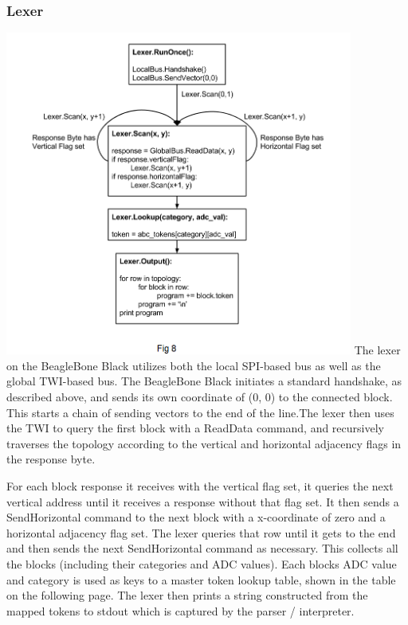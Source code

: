 \documentclass[12pt,a4paper]{article}
\begin{document}
    \subsubsection{Lexer}
    \includegraphics[width=4.5in]{LX.png}
    The lexer on the BeagleBone Black utilizes both the local SPI-based bus as well as the global TWI-based bus. The BeagleBone Black initiates a standard handshake, as described above, and sends its own coordinate of (0, 0) to the connected block. This starts a chain of sending vectors to the \textquotesingle end of the line.\textquotesingle   The lexer then uses the TWI to query the first block with a ReadData command, and recursively traverses the topology according to the vertical and horizontal adjacency flags in the response byte. 
    
    
    For each block response it receives with the vertical flag set, it queries the next vertical address until it receives a response without that flag set. It then sends a SendHorizontal command to the next block with a x-coordinate of zero and a horizontal adjacency flag set. The lexer queries that row until it gets to the end and then sends the next SendHorizontal command as necessary. This collects all the blocks (including their categories and ADC values). Each block\textquotesingle s ADC value and category is used as keys to a master token lookup table, shown in the table on the following page.     The lexer then prints a string constructed from the mapped tokens to stdout which is captured by the parser / interpreter.
    
\end{document}
